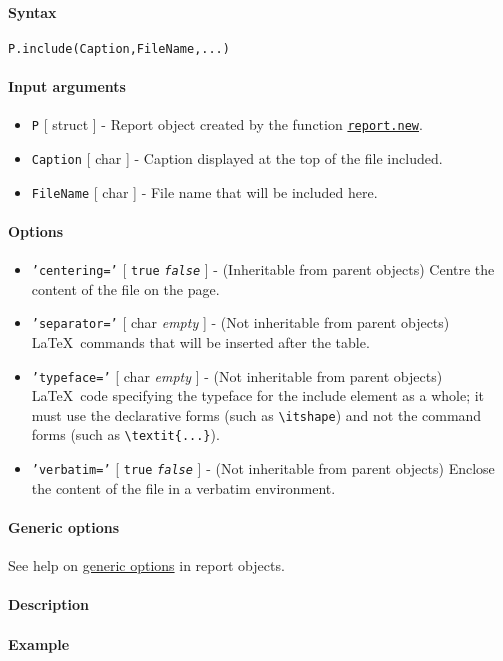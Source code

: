 


	\paragraph{Syntax}

\begin{verbatim}
P.include(Caption,FileName,...)
\end{verbatim}

\paragraph{Input arguments}

\begin{itemize}
\item
  \texttt{P} {[} struct {]} - Report object created by the function
  \href{report/new}{\texttt{report.new}}.
\item
  \texttt{Caption} {[} char {]} - Caption displayed at the top of the
  file included.
\item
  \texttt{FileName} {[} char {]} - File name that will be included here.
\end{itemize}

\paragraph{Options}

\begin{itemize}
\item
  \texttt{'centering='} {[} \texttt{true} \textbar{}
  \emph{\texttt{false}} {]} - (Inheritable from parent objects) Centre
  the content of the file on the page.
\item
  \texttt{'separator='} {[} char \textbar{} \emph{empty} {]} - (Not
  inheritable from parent objects) \LaTeX~commands that will be inserted
  after the table.
\item
  \texttt{'typeface='} {[} char \textbar{} \emph{empty} {]} - (Not
  inheritable from parent objects) \LaTeX~code specifying the typeface
  for the include element as a whole; it must use the declarative forms
  (such as \texttt{\textbackslash{}itshape}) and not the command forms
  (such as \texttt{\textbackslash{}textit\{...\}}).
\item
  \texttt{'verbatim='} {[} \texttt{true} \textbar{}
  \emph{\texttt{false}} {]} - (Not inheritable from parent objects)
  Enclose the content of the file in a verbatim environment.
\end{itemize}

\paragraph{Generic options}

See help on \href{report/Contents}{generic options} in report objects.

\paragraph{Description}

\paragraph{Example}


